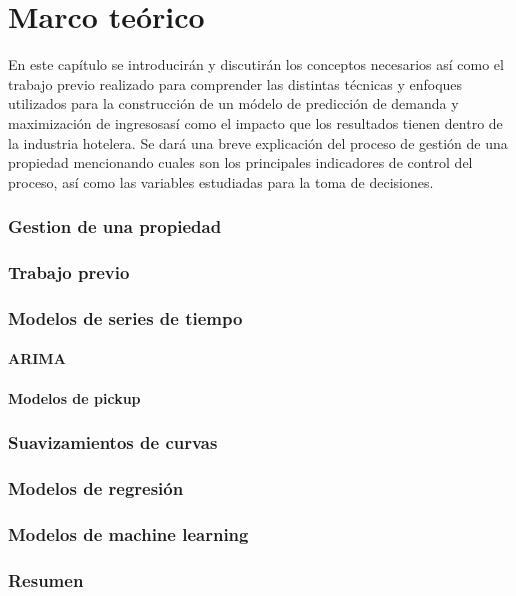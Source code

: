 \chapter{Marco teórico}
\label{ch:marco teorico}

En este capítulo se introducirán y discutirán los conceptos necesarios así como el trabajo previo realizado para comprender las distintas técnicas y enfoques utilizados para la construcción de un módelo de predicción de demanda y maximización de ingresosasí como el impacto que los resultados tienen dentro de la industria hotelera. Se dará una breve explicación del proceso de gestión de una propiedad mencionando cuales son los principales indicadores de control del proceso, así como las variables estudiadas para la toma de decisiones.

\subsection*{Gestion de una propiedad}
\subsection*{Trabajo previo}
\subsection*{Modelos de series de tiempo}
\subsubsection*{ARIMA}
\subsubsection*{Modelos de pickup}
\subsection*{Suavizamientos de curvas}
\subsection*{Modelos de regresión}
\subsection*{Modelos de machine learning}
\subsection*{Resumen}
